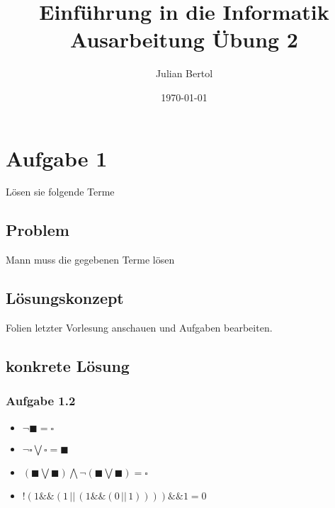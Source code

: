 \documentclass[a4paper,11pt,titlepage]{article}
\begin{document}
\title{Einf\"uhrung in die Informatik\\
Ausarbeitung \"Ubung 2}


\author{Julian Bertol}


\date{\today}

\maketitle{\thispagestyle{plain}}

\section{Aufgabe 1}
L\"osen sie folgende Terme

\subsection{Problem}
Mann muss die gegebenen Terme l\"osen
\subsection{L\"osungskonzept}
Folien letzter Vorlesung anschauen und Aufgaben bearbeiten.
\subsection{konkrete L\"osung}
\subsubsection{Aufgabe 1.2}
\begin{itemize}
  \item $\neg \blacksquare = \square$
  \item $\neg \square \bigvee \square = \blacksquare$
  \item $(\blacksquare \bigvee \blacksquare) \bigwedge \neg (\blacksquare \bigvee \blacksquare) = \square$
  \item $!(1 \&\& (1 \,||\, (1 \&\& (0 \,||\, 1)))) \&\& 1 = 0$
\end{itemize}
\end{document}
